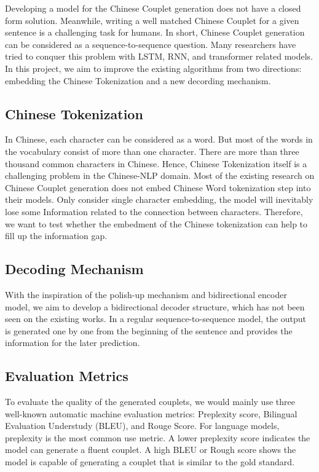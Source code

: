 \documentclass[11pt]{article}
\begin{document}
Developing a model for the Chinese Couplet generation does not have a closed form solution. Meanwhile, writing a well matched Chinese Couplet for a given sentence is a challenging task for humans. In short, Chinese Couplet generation can be considered as a sequence-to-sequence question. Many researchers have tried to conquer this problem with LSTM, RNN, and transformer related models. In this project, we aim to improve the existing algorithms from two directions: embedding the Chinese Tokenization and a new decording mechanism.



\subsection{Chinese Tokenization}

In Chinese, each character can be considered as a word. But most of the words in the vocabulary consist of more than one character. There are more than three thousand common characters in Chinese. Hence, Chinese Tokenization itself is a challenging problem in the Chinese-NLP domain. Most of the existing research on Chinese Couplet generation does not embed Chinese Word tokenization step into their models. Only consider single character embedding, the model will inevitably lose some Information related to the connection between characters. Therefore, we want to test whether the embedment of the Chinese tokenization can help to fill up the information gap.

\subsection{Decoding Mechanism}
\label{sect:pdf}

With the inspiration of the polish-up mechanism and bidirectional encoder model, we aim to develop a bidirectional decoder structure, which has not been seen on the existing works. In a regular sequence-to-sequence model, the output is generated one by one from the beginning of the sentence and provides the information for the later prediction.


\subsection{Evaluation Metrics}
\label{ssec:layout}

To evaluate the quality of the generated couplets, we would mainly use three well-known automatic machine evaluation metrics: Preplexity score, Bilingual Evaluation Understudy (BLEU), and Rouge Score. For language models, preplexity is the most common use metric. A lower preplexity score indicates the model can generate a fluent couplet. A high BLEU or Rough score shows the model is capable of generating a couplet that is similar to the gold standard. 
\end{document}
